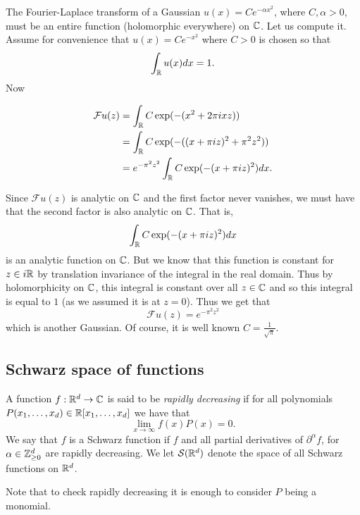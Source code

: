 \documentclass[twoside, a4paper, 10pt]{amsart}
\begin{document}
\begin{eg}\label{eg: FT of Gaussian} The Fourier-Laplace transform of a Gaussian $u(x) = C e^{- \alpha x^2}$, where $C,\alpha>0$, must be an entire function (holomorphic everywhere) on $\mathbb{C}$. Let us compute it. Assume for convenience that $u(x) = C e^{-x^2}$ where $C>0$ is chosen so that $$\int_{\mathbb{R}} u(x) dx = 1.$$ Now 

\begin{align*} \mathcal{F}u (z) &=  \int_{\mathbb{R}} C \exp ( -(x^2 + 2\pi i x z)) \\ &=  \int_{\mathbb{R}} C\exp (- ((x+\pi i z)^2 + \pi^2 z^2)) \\ &=  e^{-\pi^2z^2} \int_{\mathbb{R}} C \exp(-(x+\pi i z)^2) dx. \end{align*}

Since $\mathcal{F}u(z)$ is analytic on $\mathbb{C}$ and the first factor never vanishes, we must have that the second factor is also analytic on $\mathbb{C}$. That is, $$\int_{\mathbb{R}} C \exp(-(x+\pi i z)^2) dx$$ is an analytic function on $\mathbb{C}$. But we know that this function is constant for $z \in i \mathbb{R}$ by translation invariance of the integral in the real domain. Thus by holomorphicity on $\mathbb{C}$, this integral is constant over all $z \in \mathbb{C}$ and so this integral is equal to $1$ (as we assumed it is at $z=0$). Thus we get that $$\mathcal{F}u(z) = e^{-\pi^2 z^2}$$ which is another Gaussian. Of course, it is well known $C = \frac{1}{\sqrt{\pi}}$.

\end{eg}

\subsection{Schwarz space of functions}

\begin{mydef} A function $f:\mathbb{R}^d \to \mathbb{C}$ is said to be \textit{rapidly decreasing} if for all polynomials $P(x_1, \dots, x_d) \in \mathbb{R}[x_1, \ldots, x_d]$ we have that $$\lim_{x \to \infty} f(x)P(x) = 0.$$ We say that $f$ is a Schwarz function if $f$ and all partial derivatives of $\partial^{\alpha}f$, for $\alpha \in \mathbb{Z}_{\geq 0}^d$ are rapidly decreasing. We let $\mathcal{S}(\mathbb{R}^d)$ denote the space of all Schwarz functions on $\mathbb{R}^d$.

\end{mydef}

Note that to check rapidly decreasing it is enough to consider $P$ being a monomial.
\end{document}
